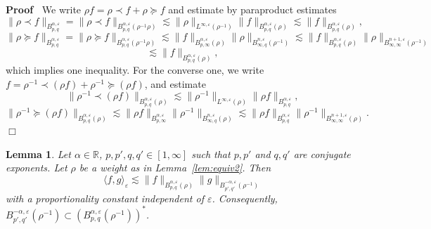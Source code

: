 \documentclass[a4paper,11pt]{article}
\newenvironment{proof}{\noindent\textbf{Proof\ }}{\hspace*{\fill}$\Box$\medskip}
\newtheorem{lemma}[theorem]{Lemma}
\numberwithin{equation}{section}
\begin{document}
\begin{proof}
  We write $\rho f = \rho \prec f + \rho \succcurlyeq f$ and estimate by
  paraproduct estimates
  \[ \| \rho \prec f \|_{B^{\alpha, \varepsilon}_{p, q}} = \| \rho \prec f
     \|_{B^{\alpha, \varepsilon}_{p, q} (\rho^{- 1} \rho)} \lesssim \| \rho
     \|_{L^{\infty, \varepsilon} (\rho^{- 1})} \| f \|_{B^{\alpha,
     \varepsilon}_{p, q} (\rho)} \lesssim \| f \|_{B^{\alpha, \varepsilon}_{p,
     q} (\rho)}, \]
  \[ \| \rho \succcurlyeq f \|_{B^{\alpha, \varepsilon}_{p, q}} = \| \rho
     \succcurlyeq f \|_{B^{\alpha, \varepsilon}_{p, q} (\rho^{- 1} \rho)}
     \lesssim \| f \|_{B^{\alpha, \varepsilon}_{p, \infty} (\rho)} \| \rho
     \|_{B^{n, \varepsilon}_{\infty, q} (\rho^{- 1})} \lesssim \| f
     \|_{B^{\alpha, \varepsilon}_{p, q} (\rho)} \| \rho \|_{B^{n + 1,
     \varepsilon}_{\infty, \infty} (\rho^{- 1})} \]
  \[ \lesssim \| f \|_{B^{\alpha, \varepsilon}_{p, q} (\rho)}, \]
  which implies one inequality. For the converse one, we write $f = \rho^{- 1}
  \prec (\rho f) + \rho^{- 1} \succcurlyeq (\rho f)$, and estimate
  \[ \| \rho^{- 1} \prec (\rho f) \|_{B^{\alpha, \varepsilon}_{p, q} (\rho)}
     \lesssim \| \rho^{- 1} \|_{L^{\infty, \varepsilon} (\rho)} \| \rho f
     \|_{B^{\alpha, \varepsilon}_{p, q}}, \]
  \[ \| \rho^{- 1} \succcurlyeq (\rho f) \|_{B^{\alpha, \varepsilon}_{p, q}
     (\rho)} \lesssim \| \rho f \|_{B^{\alpha, \varepsilon}_{p, \infty}} \|
     \rho^{- 1} \|_{B^{n, \varepsilon}_{\infty, q} (\rho)} \lesssim \| \rho f
     \|_{B^{\alpha, \varepsilon}_{p, q}} \| \rho^{- 1} \|_{B^{n + 1,
     \varepsilon}_{\infty, \infty} (\rho)} . \]
\end{proof}

\begin{lemma}
  \label{lem:dual2}Let $\alpha \in \mathbb{R}$, $p, p', q, q' \in [1, \infty]$
  such that $p, p'$ and $q, q'$ are conjugate exponents. Let $\rho$ be a
  weight as in Lemma~\ref{lem:equiv2}. Then
  \[ \langle f, g \rangle_{\varepsilon} \lesssim \| f \|_{B_{p, q}^{\alpha,
     \varepsilon} (\rho)} \| g \|_{B_{p', q'}^{- \alpha, \varepsilon}
     (\rho^{- 1})} \]
  with a proportionality constant independent of $\varepsilon$. Consequently,
  $B^{- \alpha, \varepsilon}_{p', q'} (\rho^{- 1}) \subset (B^{\alpha,
  \varepsilon}_{p, q} (\rho^{- 1}))^{\ast}$.
\end{lemma}
\end{document}
